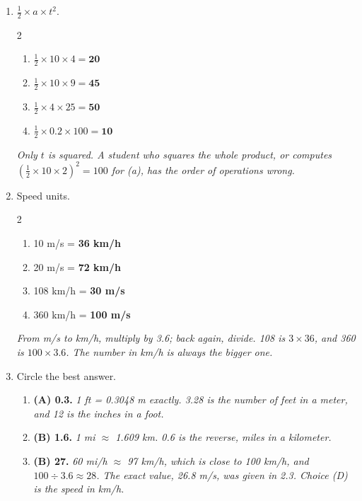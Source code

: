 \documentclass[12pt, twoside]{article}
\begin{document}
\begin{enumerate}[itemsep=0.3cm]
\item $\frac{1}{2} \times a \times t^2$.
  \begin{multicols}{2}
    \begin{enumerate}[itemsep=0.1cm]
      \item $\frac{1}{2} \times 10 \times 4 = \mathbf{20}$
      \item $\frac{1}{2} \times 10 \times 9 = \mathbf{45}$
      \item $\frac{1}{2} \times 4 \times 25 = \mathbf{50}$
      \item $\frac{1}{2} \times 0.2 \times 100 = \mathbf{10}$
    \end{enumerate}
  \end{multicols}
  \emph{Only $t$ is squared. A student who squares the whole product, or computes
  $(\frac{1}{2} \times 10 \times 2)^2 = 100$ for (a), has the order of operations
  wrong.}

\item Speed units.
  \begin{multicols}{2}
    \begin{enumerate}[itemsep=0.1cm]
      \item 10 m/s = \textbf{36 km/h}
      \item 20 m/s = \textbf{72 km/h}
      \item 108 km/h = \textbf{30 m/s}
      \item 360 km/h = \textbf{100 m/s}
    \end{enumerate}
  \end{multicols}
  \emph{From m/s to km/h, multiply by 3.6; back again, divide. 108 is $3 \times 36$,
  and 360 is $100 \times 3.6$. The number in km/h is always the bigger one.}

\item Circle the best answer.
  \begin{enumerate}[itemsep=0.1cm]
    \item \textbf{(A) 0.3.} \emph{1 ft = 0.3048 m exactly. 3.28 is the number of feet
      in a meter, and 12 is the inches in a foot.}
    \item \textbf{(B) 1.6.} \emph{1 mi $\approx$ 1.609 km. 0.6 is the reverse,
      miles in a kilometer.}
    \item \textbf{(B) 27.} \emph{60 mi/h $\approx$ 97 km/h, which is close to
      100 km/h, and $100 \div 3.6 \approx 28$. The exact value, 26.8 m/s, was given in
      2.3. Choice (D) is the speed in km/h.}
  \end{enumerate}


\end{enumerate}
\end{document}
